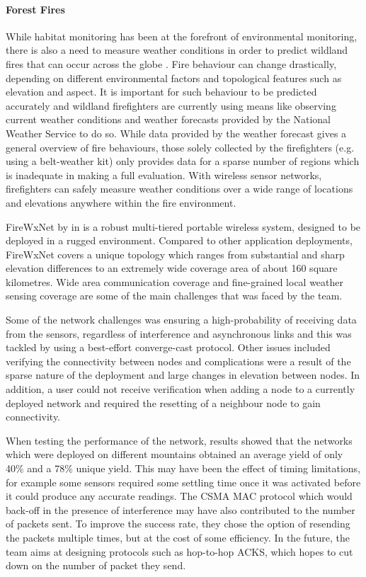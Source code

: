 \paragraph{Forest Fires} While habitat monitoring has been at the forefront of environmental monitoring, there is also a need to measure weather conditions in order to predict wildland fires that can occur across the globe \cite{libeliumForestFires,FireWxNet,4428702}. Fire behaviour can change drastically, depending on different environmental factors and topological features such as elevation and aspect. It is important for such behaviour to be predicted accurately and wildland firefighters are currently using means like observing current weather conditions and weather forecasts provided by the National Weather Service to do so. While data provided by the weather forecast gives a general overview of fire behaviours, those solely collected by the firefighters (e.g. using a belt-weather kit) only provides data for a sparse number of regions which is inadequate in making a full evaluation. With wireless sensor networks, firefighters can safely measure weather conditions over a wide range of locations and elevations anywhere within the fire environment.

FireWxNet by \citeauthor{FireWxNet} in \cite{FireWxNet} is a robust multi-tiered portable wireless system, designed to be deployed in a rugged environment. Compared to other application deployments, FireWxNet covers a unique topology which ranges from substantial and sharp elevation differences to an extremely wide coverage area of about 160 square kilometres. Wide area communication coverage and fine-grained local weather sensing coverage are some of the main challenges that was faced by the team. 

Some of the network challenges was ensuring a high-probability of receiving data from the sensors, regardless of interference and asynchronous links and this was tackled by using a best-effort converge-cast protocol. Other issues included verifying the connectivity between nodes and complications were a result of the sparse nature of the deployment and large changes in elevation between nodes. In addition, a user could not receive verification when adding a node to a currently deployed network and required the resetting of a neighbour node to gain connectivity.

When testing the performance of the network, results showed that the networks which were deployed on different mountains obtained an average yield of only 40\% and a 78\% unique yield. This may have been the effect of timing limitations, for example some sensors required some settling time once it was activated before it could produce any accurate readings. The CSMA MAC protocol which would back-off in the presence of interference may have also contributed to the number of packets sent. To improve the success rate, they chose the option of resending the packets multiple times, but at the cost of some efficiency. In the future, the team aims at designing protocols such as hop-to-hop ACKS, which hopes to cut down on the number of packet they send.



